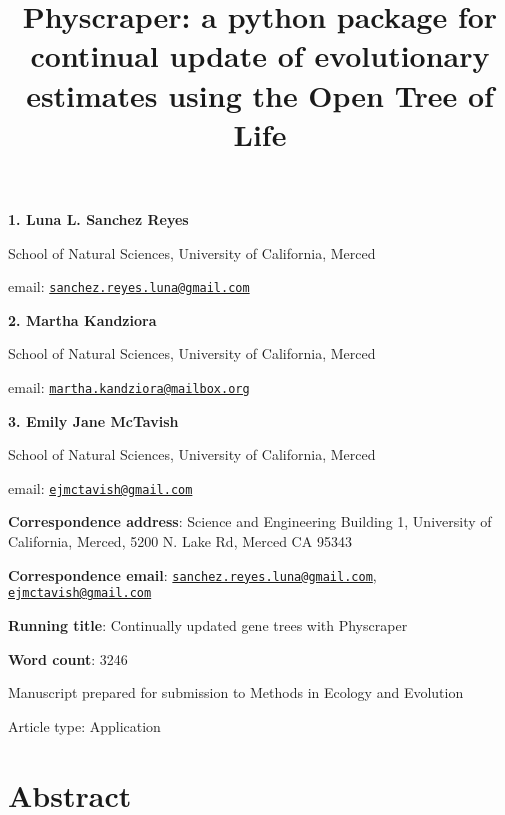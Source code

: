 \documentclass[]{article}
\title{Physcraper: a python package for continual update of evolutionary estimates using the Open Tree of Life}
\author{}
\date{\vspace{-2.5em}}
\begin{document}
\maketitle

\textbf{1. Luna L. Sanchez Reyes}

School of Natural Sciences, University of California, Merced

email: \href{mailto:sanchez.reyes.luna@gmail.com}{\nolinkurl{sanchez.reyes.luna@gmail.com}}

\textbf{2. Martha Kandziora}

School of Natural Sciences, University of California, Merced

email: \href{mailto:martha.kandziora@mailbox.org}{\nolinkurl{martha.kandziora@mailbox.org}}

\textbf{3. Emily Jane McTavish}

School of Natural Sciences, University of California, Merced

email: \href{mailto:ejmctavish@gmail.com}{\nolinkurl{ejmctavish@gmail.com}}

\textbf{Correspondence address}: Science and Engineering Building 1, University of California, Merced, 5200 N. Lake Rd, Merced CA 95343

\textbf{Correspondence email}: \href{mailto:sanchez.reyes.luna@gmail.com}{\nolinkurl{sanchez.reyes.luna@gmail.com}}, \href{mailto:ejmctavish@gmail.com}{\nolinkurl{ejmctavish@gmail.com}}

\textbf{Running title}: Continually updated gene trees with Physcraper

\textbf{Word count}: 3246

Manuscript prepared for submission to Methods in Ecology and Evolution

Article type: Application

\newpage

\hypertarget{abstract}{%
\section{Abstract}\label{abstract}}
\end{document}
